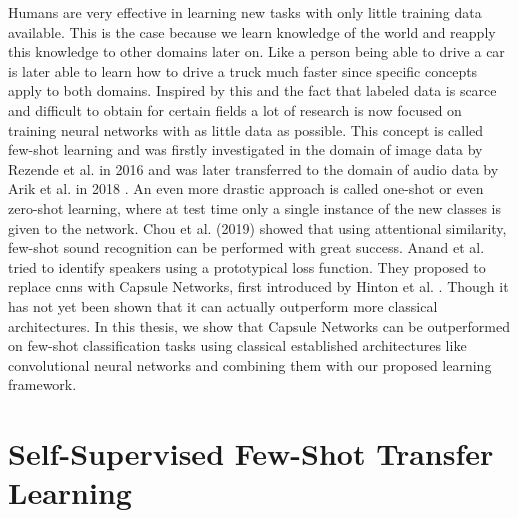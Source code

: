 Humans are very effective in learning new tasks with only little training data available. This is the case because we learn knowledge of the world and reapply this knowledge to other domains later on. Like a person being able to drive a car is later able to learn how to drive a truck much faster since specific concepts apply to both domains. Inspired by this and the fact that labeled data is scarce and difficult to obtain for certain fields a lot of research is now focused on training neural networks with as little data as possible. This concept is called few-shot learning and was firstly investigated in the domain of image data by Rezende et al. in 2016 \cite{rezende2016oneshot} and was later transferred to the domain of audio data by Arik et al. in 2018 \cite{arik2018neural}. An even more drastic approach is called one-shot or even zero-shot learning, where at test time only a single instance of the new classes is given to the network. Chou et al. (2019) \cite{chou2019learning} showed that using attentional similarity, few-shot sound recognition can be performed with great success. Anand et al. \cite{anand2019shot} tried to identify speakers using a prototypical loss function. They proposed to replace \glspl{cnn} with Capsule Networks, first introduced by Hinton et al. \cite{sabour2017dynamic}. Though it has not yet been shown that it can actually outperform more classical architectures. In this thesis, we show that Capsule Networks can be outperformed on few-shot classification tasks using classical established architectures like convolutional neural networks and combining them with our proposed learning framework.

\section{Self-Supervised Few-Shot Transfer Learning}

